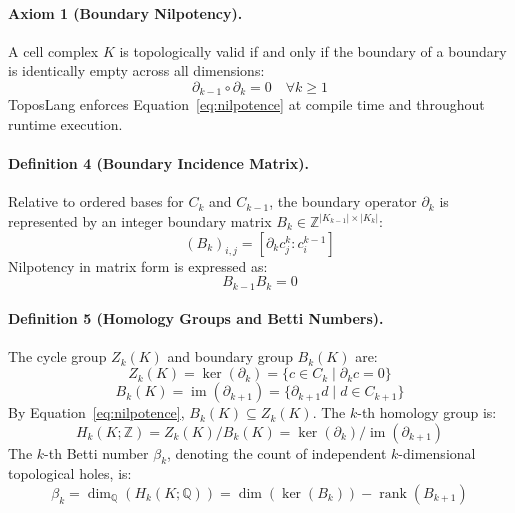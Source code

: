 \documentclass[10pt,a4paper]{article}
\begin{document}
\paragraph{Axiom 1 (Boundary Nilpotency).}
A cell complex $K$ is topologically valid if and only if the boundary of a boundary is identically empty across all dimensions:
\begin{equation}
\partial_{k-1} \circ \partial_k = 0 \quad \forall k \ge 1
\label{eq:nilpotence}
\end{equation}
ToposLang enforces Equation~\ref{eq:nilpotence} at compile time and throughout runtime execution.

\paragraph{Definition 4 (Boundary Incidence Matrix).}
Relative to ordered bases for $C_k$ and $C_{k-1}$, the boundary operator $\partial_k$ is represented by an integer boundary matrix $B_k \in \mathbb{Z}^{|K_{k-1}| \times |K_k|}$:
\begin{equation}
(B_k)_{i, j} = [\partial_k c_j^k : c_i^{k-1}]
\label{eq:matrix}
\end{equation}
Nilpotency in matrix form is expressed as:
\begin{equation}
B_{k-1} B_k = 0
\label{eq:matrix_nilpotence}
\end{equation}

\paragraph{Definition 5 (Homology Groups and Betti Numbers).}
The cycle group $Z_k(K)$ and boundary group $B_k(K)$ are:
\begin{equation}
Z_k(K) = \ker(\partial_k) = \{c \in C_k \mid \partial_k c = 0\}
\label{eq:cycles}
\end{equation}
\begin{equation}
B_k(K) = \operatorname{im}(\partial_{k+1}) = \{\partial_{k+1} d \mid d \in C_{k+1}\}
\label{eq:boundaries}
\end{equation}
By Equation~\ref{eq:nilpotence}, $B_k(K) \subseteq Z_k(K)$. The $k$-th homology group is:
\begin{equation}
H_k(K; \mathbb{Z}) = Z_k(K) / B_k(K) = \ker(\partial_k) / \operatorname{im}(\partial_{k+1})
\label{eq:homology}
\end{equation}
The $k$-th Betti number $\beta_k$, denoting the count of independent $k$-dimensional topological holes, is:
\begin{equation}
\beta_k = \dim_{\mathbb{Q}}(H_k(K; \mathbb{Q})) = \dim(\ker(B_k)) - \operatorname{rank}(B_{k+1})
\label{eq:betti}
\end{equation}
\end{document}
